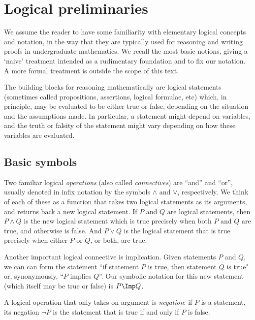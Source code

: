 
\section{Logical preliminaries}
\label{sec:logical-prelim}

We assume the reader to have some familiarity with elementary logical concepts and notation, in the way that they are typically used for reasoning and writing proofs in undergraduate mathematics.
We recall the most basic notions, giving a `naive' treatment  intended as a rudimentary foundation and to fix our notation.
A more formal treatment is outside the scope of this text.

The building blocks for reasoning mathematically are logical statements (sometimes called propositions, assertions, logical formulae, etc) which, in principle, may be evaluated to be either true or false, depending on the situation and the assumptions made.
In particular, a statement might depend on variables, and the truth or falsity of the statement might vary depending on how these variables are evaluated.

\subsection{Basic symbols}

Two familiar logical \emph{operations} (also called \emph{connectives}) are ``and'' and ``or'', usually denoted in infix notation by the symbols $\wedge$ and $\vee$, respectively.
We think of each of these as a function that takes two logical statements as its arguments, and returns back a new logical statement.
If $P$ and $Q$ are logical statements, then $P \wedge Q$ is the new logical statement which is true precisely when both $P$ and $Q$ are true, and otherwise is false.
And $P \vee Q$ is the logical statement that is true precisely when either $P$ or $Q$, or both, are true.

Another important logical connective is implication.
Given statements $P$ and $Q$, we can can form the statement ``if statement $P$ is true, then statement $Q$ is true" or, synonymously, ``$P$ implies $Q$''.
Our symbolic notation for this new statement (which itself may be true or false) is $P \Imp Q$.

A logical operation that only takes on argument is \emph{negation}: if $P$ is a statement, its negation $\lnot P$ is the statement that is true if and only if $P$ is false.

